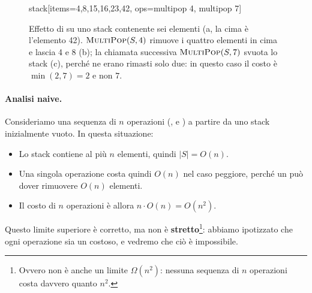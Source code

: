 \begin{figure}[htbp]
\centering
\begin{widget}{stack}[items={4,8,15,16,23,42}, ops={multipop 4, multipop 7}]
\end{widget}
\caption{Effetto di \MultiPop{} su uno stack contenente sei elementi (a, la cima è l'elemento 42). $\textsc{MultiPop}(S,4)$ rimuove i quattro elementi in cima e lascia 4 e 8 (b); la chiamata successiva $\textsc{MultiPop}(S,7)$ svuota lo stack (c), perché ne erano rimasti solo due: in questo caso il costo è $\min(2,7)=2$ e non $7$.}
\label{fig:multipop}
\end{figure}

\paragraph{Analisi naive.}
Consideriamo una sequenza di $n$ operazioni (\Push, \Pop{} e \MultiPop) a partire da uno stack inizialmente vuoto. In questa situazione:
\begin{itemize}
    \item Lo stack contiene al più $n$ elementi, quindi $|S| = O(n)$.
    \item Una singola operazione costa quindi $O(n)$ nel caso peggiore, perché un \MultiPop{} può dover rimuovere $O(n)$ elementi.
    \item Il costo di $n$ operazioni è allora $n \cdot O(n) = O(n^2)$.
\end{itemize}
Questo limite superiore è corretto, ma non è \textbf{stretto}\footnote{Ovvero non è anche un limite $\Omega(n^2)$: nessuna sequenza di $n$ operazioni costa davvero quanto $n^2$.}: abbiamo ipotizzato che ogni operazione sia un \MultiPop{} costoso, e vedremo che ciò è impossibile.

